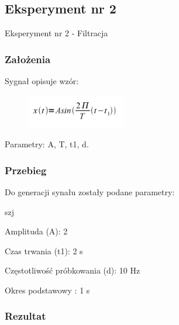 \documentclass[12pt]{article}
\begin{document}
\subsection{Eksperyment nr 2}

Eksperyment nr 2  - Filtracja
\subsubsection{Założenia}
Sygnał opisuje wzór:

\begin{figure}[h!]
 \centering
 \includegraphics[width=4.3cm]{SinWzor.PNG}
 \vspace{-0.3cm}
 \label{gw}
\end{figure}
Parametry: A, T, t1, d.

\subsubsection{Przebieg}
Do generacji synału zostały podane parametry:

\begin{labeling}{szj}
\item [Amplituda (A):] 2
\item [Czas trwania (t1):] 2 s
\item [Częstotliwość próbkowania (d): ] 10 Hz
\item [Okres podstawowy :] 1 s
\end{labeling}
\subsubsection{Rezultat}
\end{document}
